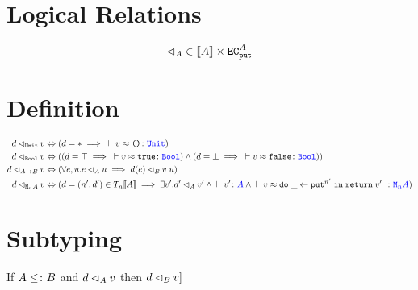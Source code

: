 \documentclass{Report}
\begin{document}
\section{Logical Relations}

\begin{equation}
    \label{LogicalRelationType}
    \lhd_A \in {\bf [\![}A{\bf ]\!]} \times \texttt{EC}_{\texttt{put}}^A    
\end{equation}

\section{Definition}
\begin{definition}

    \begin{align}
        \label{LogicalRelationDefinition}
        \logRel{d}{\U}{v} & \Leftrightarrow (d=\singleton \implies \zberelation{v}{\u}{\U})\\
        \logRel{d}{\B}{v} & \Leftrightarrow ((d=\top \implies \zberelation{v}{\t}{\B}) \wedge (d=\bot \implies \zberelation{v}{\f}{\B}))\\
        \logRel{d}{\ab}{v} & \Leftrightarrow (\forall e, u. \logRel{e}{A}{u}\implies \logRel{d(e)}{B}{\apply{v}{u}})\\
        \logRel{d}{\mna}{v}&\Leftrightarrow  (d= (n', d')\in \T{n}{\deno{A}} \implies \exists v'. \logRel{d'}{A}{v'} \wedge \ztyperelation{v'}{A}\wedge \zberelation{v}{\doin{\_}{\put^{n'}}{\return{v'}}}{\mna})
    \end{align}
\end{definition}
\section{Subtyping}

\begin{theorem}
    If $A\leq\colon B$ and $d \lhd_{A} v$ then $d \lhd_{B} v]$
\end{theorem}
\end{document}
